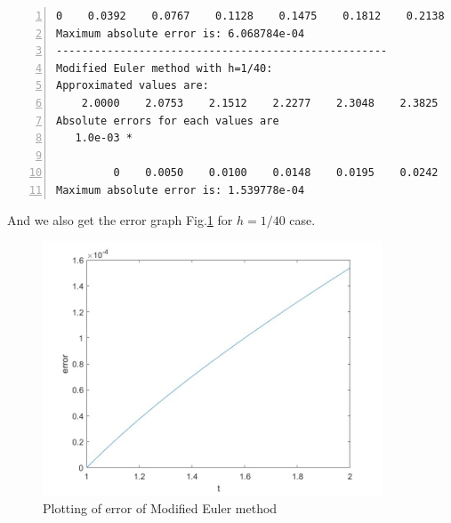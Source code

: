\documentclass{article}
\begin{document}
\begin{enumerate}
\begin{lstlisting}[frame=single, numbers=left, style=Matlab-editor]
         0    0.0392    0.0767    0.1128    0.1475    0.1812    0.2138    0.2456    0.2765    0.3067    0.3363    0.3653    0.3937    0.4217    0.4492    0.4763    0.5031    0.5295    0.5556    0.5814    0.6069
Maximum absolute error is: 6.068784e-04
----------------------------------------------------
Modified Euler method with h=1/40:
Approximated values are:
    2.0000    2.0753    2.1512    2.2277    2.3048    2.3825    2.4607    2.5395    2.6187    2.6986    2.7789    2.8597    2.9410    3.0228    3.1051    3.1878    3.2710    3.3546    3.4387    3.5232    3.6081    3.6935    3.7792    3.8654    3.9519    4.0388    4.1262    4.2139    4.3020    4.3904    4.4792    4.5684    4.6579    4.7478    4.8380    4.9285    5.0194    5.1106    5.2021    5.2940    5.3861
Absolute errors for each values are
   1.0e-03 *

         0    0.0050    0.0100    0.0148    0.0195    0.0242    0.0287    0.0332    0.0375    0.0418    0.0461    0.0503    0.0544    0.0584    0.0624    0.0664    0.0703    0.0741    0.0779    0.0817    0.0854    0.0891    0.0928    0.0964    0.1000    0.1036    0.1071    0.1106    0.1141    0.1175    0.1209    0.1243    0.1277    0.1310    0.1344    0.1377    0.1410    0.1443    0.1475    0.1508    0.1540
Maximum absolute error is: 1.539778e-04
    \end{lstlisting} And we also get the error graph Fig.\ref{fig:Modified_Euler_Method_Error_Graph} for $h=1/40$ case. \begin{figure}[h] %
        \includegraphics[width=0.9\textwidth]{assignment_5_2_fig.jpg}
        \centering
        \caption{Plotting of error of Modified Euler method}
        \label{fig:Modified_Euler_Method_Error_Graph}
    \end{figure}
    

\end{enumerate}
\end{document}
